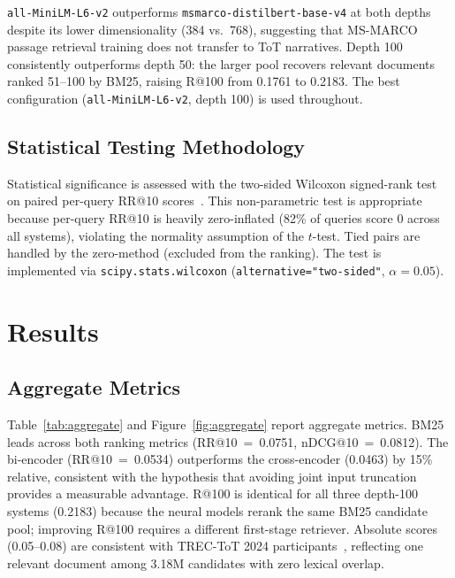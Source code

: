 \documentclass[conference]{IEEEtran}
\begin{document}
\texttt{all-MiniLM-L6-v2} outperforms \texttt{msmarco-distilbert-base-v4} at both
depths despite its lower dimensionality (384 vs.\ 768), suggesting that MS-MARCO
passage retrieval training does not transfer to ToT narratives.
Depth 100 consistently outperforms depth 50: the larger pool recovers relevant
documents ranked 51--100 by BM25, raising R@100 from 0.1761 to 0.2183.
The best configuration (\texttt{all-MiniLM-L6-v2}, depth 100) is used throughout.

\subsection{Statistical Testing Methodology}
Statistical significance is assessed with the two-sided Wilcoxon signed-rank
test on paired per-query RR@10 scores~\cite{demsar2006}.
This non-parametric test is appropriate because per-query RR@10 is heavily
zero-inflated (82\% of queries score 0 across all systems), violating the
normality assumption of the $t$-test.
Tied pairs are handled by the zero-method (excluded from the ranking).
The test is implemented via \texttt{scipy.stats.wilcoxon} (\texttt{alternative="two-sided"},
$\alpha=0.05$).

\section{Results}
\label{sec:results}

\subsection{Aggregate Metrics}

Table~\ref{tab:aggregate} and Figure~\ref{fig:aggregate} report aggregate metrics.
BM25 leads across both ranking metrics (RR@10~=~0.0751, nDCG@10~=~0.0812).
The bi-encoder (RR@10~=~0.0534) outperforms the cross-encoder (0.0463) by 15\%
relative, consistent with the hypothesis that avoiding joint input truncation
provides a measurable advantage.
R@100 is identical for all three depth-100 systems (0.2183) because the neural
models rerank the same BM25 candidate pool; improving R@100 requires a different
first-stage retriever.
Absolute scores (0.05--0.08) are consistent with TREC-ToT 2024 participants~\cite{bhatt2024},
reflecting one relevant document among 3.18M candidates with zero lexical overlap.
\end{document}
